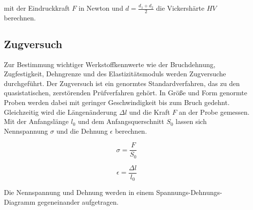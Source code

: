 mit der Eindruckkraft $F$ in Newton und $d=\frac {d_1 + d_2}{2} $ die Vickershärte $HV$ berechnen. 

\subsection{Zugversuch}
Zur Bestimmung wichtiger Werkstoffkennwerte wie der Bruchdehnung, Zugfestigkeit, Dehngrenze und des Elastizitätsmoduls werden Zugversuche durchgeführt. Der Zugversuch ist ein genormtes Standardverfahren, das zu den quasistatischen, zerstörenden Prüfverfahren gehört. In Größe und Form genormte Proben werden dabei mit geringer Geschwindigkeit bis zum Bruch gedehnt. Gleichzeitig wird die Längenänderung $\Delta l$ und die Kraft $F$ an der Probe gemessen. Mit der Anfangslänge $l_0$ und dem Anfangsquerschnitt $S_0$ lassen sich Nennspannung $\sigma$ und die Dehnung $\epsilon$ berechnen.

$$\sigma=\frac{F}{S_0}$$

$$\epsilon=\frac{\Delta l} {l_0}$$

Die Nennspannung und Dehnung werden in einem Spannungs-Dehnungs-Diagramm gegeneinander aufgetragen. 